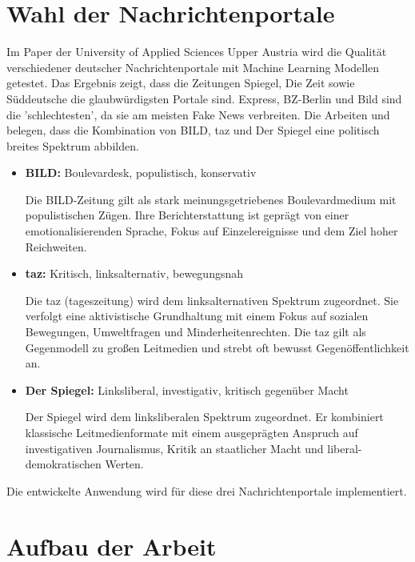 \section{Wahl der Nachrichtenportale}
\label{sec:wahl_nachrichtenportale}

Im Paper der University of Applied Sciences Upper Austria \cite{Simone2022} wird die Qualität verschiedener deutscher Nachrichtenportale mit 
Machine Learning Modellen getestet. 
Das Ergebnis zeigt, dass die Zeitungen Spiegel, Die Zeit sowie Süddeutsche die glaubwürdigsten Portale sind. Express, BZ-Berlin und Bild sind die 'schlechtesten', da sie
am meisten Fake News verbreiten.
Die Arbeiten \cite{henke2024nachrichten, Lieb2023} und \cite{Osing2022} belegen, dass die Kombination von BILD, taz und Der Spiegel eine politisch 
breites Spektrum abbilden.

\begin{itemize}
    \item \textbf{BILD:} Boulevardesk, populistisch, konservativ
   
    Die BILD-Zeitung gilt als stark meinungsgetriebenes Boulevardmedium mit populistischen Zügen. Ihre Berichterstattung ist geprägt von einer emotionalisierenden Sprache, 
    Fokus auf Einzelereignisse und dem Ziel hoher Reichweiten.

    \item \textbf{taz:} Kritisch, linksalternativ, bewegungsnah
    
    Die taz (tageszeitung) wird dem linksalternativen Spektrum zugeordnet. Sie verfolgt eine aktivistische Grundhaltung mit einem Fokus auf 
    sozialen Bewegungen, Umweltfragen und Minderheitenrechten. 
    Die taz gilt als Gegenmodell zu großen Leitmedien und strebt oft bewusst Gegenöffentlichkeit an.

    \item \textbf{Der Spiegel:} Linksliberal, investigativ, kritisch gegenüber Macht
    
    Der Spiegel wird dem linksliberalen Spektrum zugeordnet. Er kombiniert klassische Leitmedienformate mit einem ausgeprägten Anspruch auf 
    investigativen Journalismus, Kritik an staatlicher Macht und liberal-demokratischen Werten.
\end{itemize}

Die entwickelte Anwendung wird für diese drei Nachrichtenportale implementiert.

\section{Aufbau der Arbeit}
\label{sec:aufbau}

